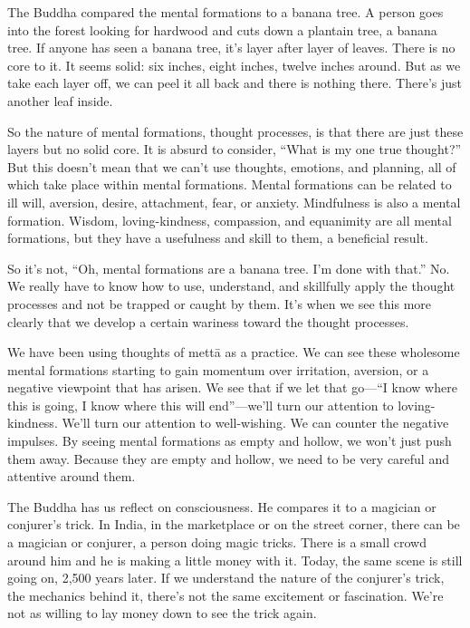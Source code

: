The Buddha compared the mental formations to a banana tree. A person
goes into the forest looking for hardwood and cuts down a plantain tree,
a banana tree. If anyone has seen a banana tree, it’s layer after layer
of leaves. There is no core to it. It seems solid: six inches, eight
inches, twelve inches around. But as we take each layer off, we can peel
it all back and there is nothing there. There’s just another leaf
inside.

So the nature of mental formations, thought processes, is that there are
just these layers but no solid core. It is absurd to consider, “What is
my one true thought?” But this doesn’t mean that we can’t use thoughts,
emotions, and planning, all of which take place within mental
formations. Mental formations can be related to ill will, aversion,
desire, attachment, fear, or anxiety. Mindfulness is also a mental
formation. Wisdom, loving-kindness, compassion, and equanimity are all
mental formations, but they have a usefulness and skill to them, a
beneficial result.

So it’s not, “Oh, mental formations are a banana tree. I’m done with
that.” No. We really have to know how to use, understand, and skillfully
apply the thought processes and not be trapped or caught by them. It’s
when we see this more clearly that we develop a certain wariness toward
the thought processes.

We have been using thoughts of mettā as a practice. We can see these
wholesome mental formations starting to gain momentum over irritation,
aversion, or a negative viewpoint that has arisen. We see that if we let
that go—“I know where this is going, I know where this will end”—we’ll
turn our attention to loving-kindness. We’ll turn our attention to
well-wishing. We can counter the negative impulses. By seeing mental
formations as empty and hollow, we won’t just push them away. Because
they are empty and hollow, we need to be very careful and attentive
around them.

The Buddha has us reflect on consciousness. He compares it to a magician
or conjurer’s trick. In India, in the marketplace or on the street
corner, there can be a magician or conjurer, a person doing magic
tricks. There is a small crowd around him and he is making a little
money with it. Today, the same scene is still going on, 2,500 years
later. If we understand the nature of the conjurer’s trick, the
mechanics behind it, there’s not the same excitement or fascination.
We’re not as willing to lay money down to see the trick again.

